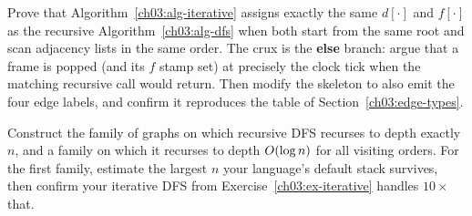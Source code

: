 \begin{exercise}\label{ch03:ex-cursor}
Prove that Algorithm~\ref{ch03:alg-iterative} assigns exactly the same $d[\cdot]$ and $f[\cdot]$ as the recursive Algorithm~\ref{ch03:alg-dfs} when both start from the same root and scan adjacency lists in the same order. The crux is the \textbf{else} branch: argue that a frame is popped (and its $f$ stamp set) at precisely the clock tick when the matching recursive call would return. Then modify the skeleton to also emit the four edge labels, and confirm it reproduces the table of Section~\ref{ch03:edge-types}.
\end{exercise}

\begin{exercise}\label{ch03:ex-deep}
Construct the family of graphs on which recursive DFS recurses to depth exactly $n$, and a family on which it recurses to depth $O(\log n)$ for all visiting orders. For the first family, estimate the largest $n$ your language's default stack survives, then confirm your iterative DFS from Exercise~\ref{ch03:ex-iterative} handles $10\times$ that.
\end{exercise}
